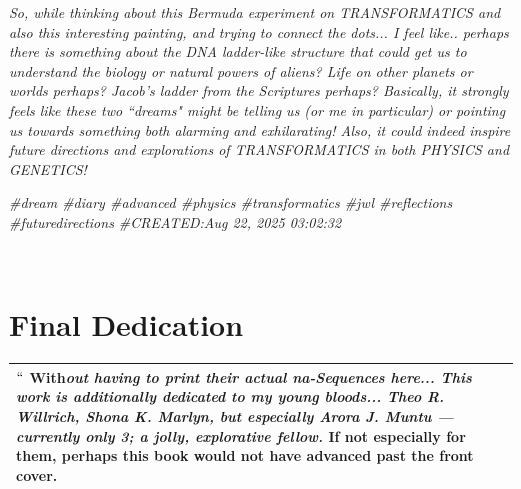 \documentclass[a4paper, 18pt]{book} %
\newcommand{\comment}[1]{}
\begin{document}
\begin{appendices}
\textit{So, while thinking about this Bermuda experiment on TRANSFORMATICS and also this interesting painting, and trying to connect the dots... I feel like.. perhaps there is something about the DNA ladder-like structure that could get us to understand the biology or natural powers of aliens? Life on other planets or worlds perhaps? Jacob's ladder from the Scriptures perhaps? Basically, it strongly feels like these two ``dreams" might be telling us (or me in particular) or pointing us towards something both alarming and exhilarating! Also, it could indeed inspire future directions and explorations of TRANSFORMATICS in both PHYSICS and GENETICS!}


\textit{\#dream \#diary \#advanced \#physics \#transformatics \#jwl \#reflections \#futuredirections
\#CREATED:Aug 22, 2025 03:02:32}

\Large



\end{appendices}








\vspace{5cm}
\\




\chapter*{Final Dedication}


\begin{table}[H]
  \centering
  \Huge
	\begin{tabular}[t]{|p{}}
$   ``$ \textbf{With}\textit{out having to print their actual \textbf{na-Sequences} here...    \Large This work is additionally dedicated to my \textit{young bloods}... \textbf{Theo R. Willrich}, \textbf{Shona K. Marlyn}, but especially  \textbf{Arora J. Muntu} --- currently only 3; a jolly, explorative fellow.} If not especially for them, perhaps this \textbf{book would not have advanced past the front cover.}\\
	\hline
	              
\end{tabular}
  \label{TABFINDEDC}
\end{table}
\end{document}
